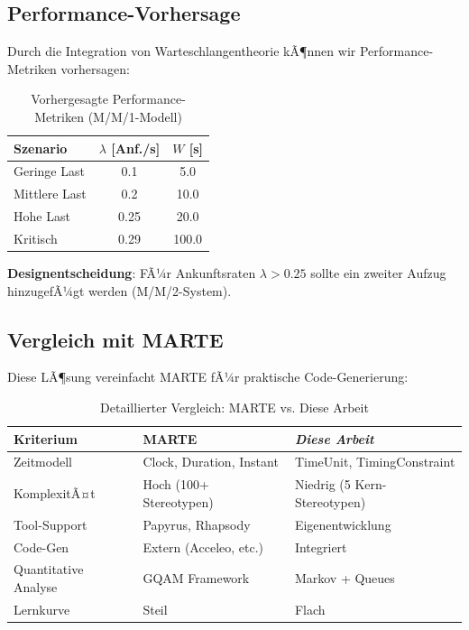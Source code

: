 ﻿\documentclass[a4paper,12pt]{scrreprt}
\theoremstyle{definition}
\begin{document}
\subsection{Performance-Vorhersage}

Durch die Integration von Warteschlangentheorie kÃ¶nnen wir Performance-Metriken vorhersagen:

\begin{table}[h]
	\centering
	\begin{tabular}{@{}lcc@{}}
		\toprule
		\textbf{Szenario} & \textbf{$\lambda$ [Anf./s]} & \textbf{$W$ [s]} \\
		\midrule
		Geringe Last & 0.1 & 5.0 \\
		Mittlere Last & 0.2 & 10.0 \\
		Hohe Last & 0.25 & 20.0 \\
		Kritisch & 0.29 & 100.0 \\
		\bottomrule
	\end{tabular}
	\caption{Vorhergesagte Performance-Metriken (M/M/1-Modell)}
	\label{tab:performance-prediction}
\end{table}

\textbf{Designentscheidung}: FÃ¼r Ankunftsraten $\lambda > 0.25$ sollte ein zweiter Aufzug hinzugefÃ¼gt werden (M/M/2-System).

\subsection{Vergleich mit MARTE}

Diese LÃ¶sung vereinfacht MARTE fÃ¼r praktische Code-Generierung:

\begin{table}[h]
	\centering
	\begin{tabular}{@{}lll@{}}
		\toprule
		\textbf{Kriterium} & \textbf{MARTE} & \textbf{\textit{Diese Arbeit}} \\
		\midrule
		Zeitmodell & Clock, Duration, Instant & TimeUnit, TimingConstraint \\
		KomplexitÃ¤t & Hoch (100+ Stereotypen) & Niedrig (5 Kern-Stereotypen) \\
		Tool-Support & Papyrus, Rhapsody & Eigenentwicklung \\
		Code-Gen & Extern (Acceleo, etc.) & Integriert \\
		Quantitative Analyse & GQAM Framework & Markov + Queues \\
		Lernkurve & Steil & Flach \\
		\bottomrule
	\end{tabular}
	\caption{Detaillierter Vergleich: MARTE vs. Diese Arbeit}
	\label{tab:marte-detailed}
\end{table}
\end{document}

